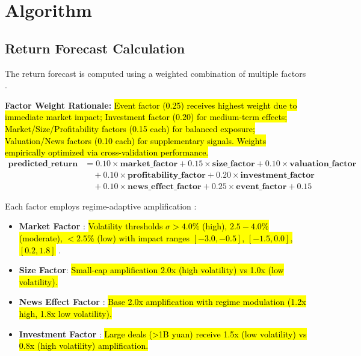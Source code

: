 \documentclass[3p,times,procedia]{elsarticle}
\begin{document}
\section{Algorithm}
\vspace{-3pt}
\subsection{Return Forecast Calculation}
The return forecast is computed using a weighted combination of multiple factors \cite{FAMA1993}.

\textbf{Factor Weight Rationale:} \hl{Event factor (0.25) receives highest weight due to immediate market impact; Investment factor (0.20) for medium-term effects; Market/Size/Profitability factors (0.15 each) for balanced exposure; Valuation/News factors (0.10 each) for supplementary signals. Weights empirically optimized via cross-validation performance.}
\begin{align}
\mathbf{predicted\_return} &= 0.10 \times \mathbf{market\_factor} + 0.15 \times \mathbf{size\_factor} + 0.10 \times \mathbf{valuation\_factor} \nonumber \\
&\quad + 0.10 \times \mathbf{profitability\_factor} + 0.20 \times \mathbf{investment\_factor} \nonumber \\
&\quad + 0.10 \times \mathbf{news\_effect\_factor} + 0.25 \times \mathbf{event\_factor} + 0.15
\end{align}

Each factor employs regime-adaptive amplification \cite{Carhart1997}:

\begin{itemize}\setlength{\itemsep}{2pt}
\item \textbf{Market Factor} \cite{FAMA1993}: \hl{Volatility thresholds $\sigma > 4.0\%$ (high), $2.5-4.0\%$ (moderate), $<2.5\%$ (low) with impact ranges $[-3.0, -0.5]$, $[-1.5, 0.0]$, $[0.2, 1.8]$} \cite{Nelson1991}.

\item \textbf{Size Factor}: \hl{Small-cap amplification 2.0x (high volatility) vs 1.0x (low volatility).}

\item \textbf{News Effect Factor} \cite{TETLOCK2007}: \hl{Base 2.0x amplification with regime modulation (1.2x high, 1.8x low volatility).}

\item \textbf{Investment Factor} \cite{Daniel1998}: \hl{Large deals (>1B yuan) receive 1.5x (low volatility) vs 0.8x (high volatility) amplification.}
\end{itemize}
\end{document}

